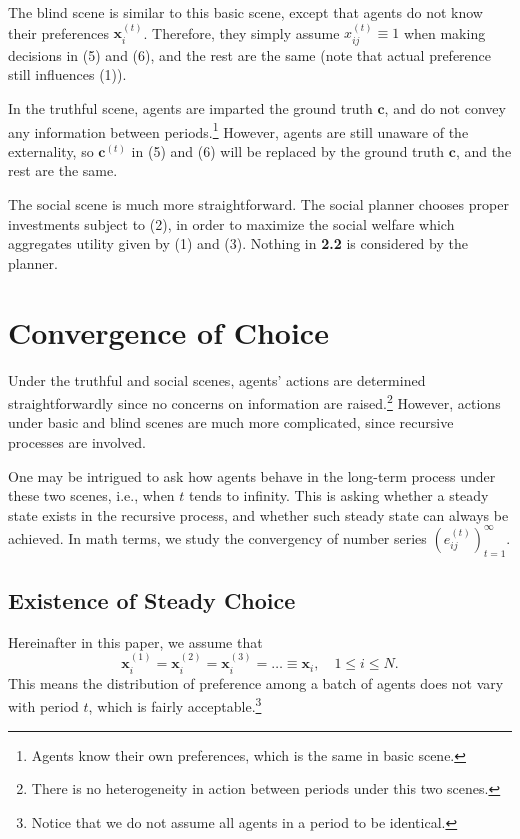 \documentclass[12pt,english]{article}
\theoremstyle{plain}
\theoremstyle{plain}
\begin{document}
	The blind scene is similar to this basic scene, except that agents do not know their preferences $\mathbf{x}_i^{(t)}$. Therefore, they simply assume $x_{ij}^{(t)} \equiv 1$ when making decisions in (5) and (6), and the rest are the same (note that actual preference still influences (1)).\par 
	
	In the truthful scene, agents are imparted the ground truth $\mathbf{c}$, and do not convey any information between periods.\footnote{Agents know their own preferences, which is the same in basic scene.} However, agents are still unaware of the externality, so $\mathbf{c}^{(t)}$ in (5) and (6) will be replaced by the ground truth $\mathbf{c}$, and the rest are the same.\par
	
	The social scene is much more straightforward. The social planner chooses proper investments subject to (2), in order to maximize the social welfare which aggregates utility given by (1) and (3). Nothing in \textbf{2.2} is considered by the planner. 
	
	
	\section{Convergence of Choice}
	Under the truthful and social scenes, agents' actions are determined straightforwardly since no concerns on information are raised.\footnote{There is no heterogeneity in action between periods under this two scenes.} However, actions under basic and blind scenes are much more complicated, since recursive processes are involved.\par 
	One may be intrigued to ask how agents behave in the long-term process under these two scenes, i.e., when $t$ tends to infinity. This is asking whether a steady state exists in the recursive process, and whether such steady state can always be achieved. In math terms, we study the convergency of number series $\left(e_{ij}^{(t)}\right)_{t = 1}^{\infty}$.\par
	
	\subsection{Existence of Steady Choice}
	Hereinafter in this paper, we assume that
	\begin{equation}
	\mathbf{x}_i^{(1)} = \mathbf{x}_i^{(2)} = \mathbf{x}_i^{(3)} = \dots \equiv \mathbf{x}_i, \quad  1\leqslant i\leqslant N.
	\end{equation}
	This means the distribution of preference among a batch of agents does not vary with period $t$, which is fairly acceptable.\footnote{Notice that we do not assume all agents in a period to be identical.}\par
	
\end{document}
